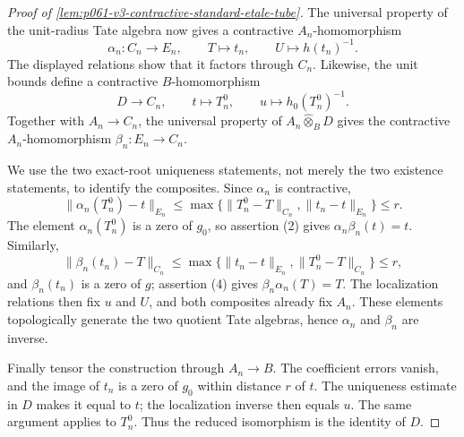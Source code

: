 \begin{proof}[Proof of
\cref{lem:p061-v3-contractive-standard-etale-tube}]
The universal property of the unit-radius Tate algebra now gives a
contractive \(A_n\)-homomorphism
\[
 \alpha_n:C_n\longrightarrow E_n,
 \qquad T\longmapsto t_n,
 \qquad U\longmapsto h(t_n)^{-1}.
\]
The displayed relations show that it factors through \(C_n\). Likewise,
the unit bounds define a contractive \(B\)-homomorphism
\[
 D\longrightarrow C_n,
 \qquad t\longmapsto T_n^0,
 \qquad u\longmapsto h_0(T_n^0)^{-1}.
\]
Together with \(A_n\to C_n\), the universal property of
\(A_n\widehat\otimes_BD\) gives the contractive
\(A_n\)-homomorphism \(\beta_n:E_n\to C_n\).

We use the two exact-root uniqueness statements, not merely the two
existence statements, to identify the composites. Since \(\alpha_n\) is
contractive,
\[
 \|\alpha_n(T_n^0)-t\|_{E_n}
 \leq\max\bigl\{\|T_n^0-T\|_{C_n},
                  \|t_n-t\|_{E_n}\bigr\}\leq r.
\]
The element \(\alpha_n(T_n^0)\) is a zero of \(g_0\), so assertion (2)
gives \(\alpha_n\beta_n(t)=t\). Similarly,
\[
 \|\beta_n(t_n)-T\|_{C_n}
 \leq\max\bigl\{\|t_n-t\|_{E_n},
                  \|T_n^0-T\|_{C_n}\bigr\}\leq r,
\]
and \(\beta_n(t_n)\) is a zero of \(g\); assertion (4) gives
\(\beta_n\alpha_n(T)=T\). The localization relations then fix \(u\) and
\(U\), and both composites already fix \(A_n\). These elements
topologically generate the two quotient Tate algebras, hence
\(\alpha_n\) and \(\beta_n\) are inverse.

Finally tensor the construction through \(A_n\to B\). The coefficient
errors vanish, and the image of \(t_n\) is a zero of \(g_0\) within
distance \(r\) of \(t\). The uniqueness estimate in \(D\) makes it
equal to \(t\); the localization inverse then equals \(u\). The same
argument applies to \(T_n^0\). Thus the reduced isomorphism is the
identity of \(D\).
\end{proof}

